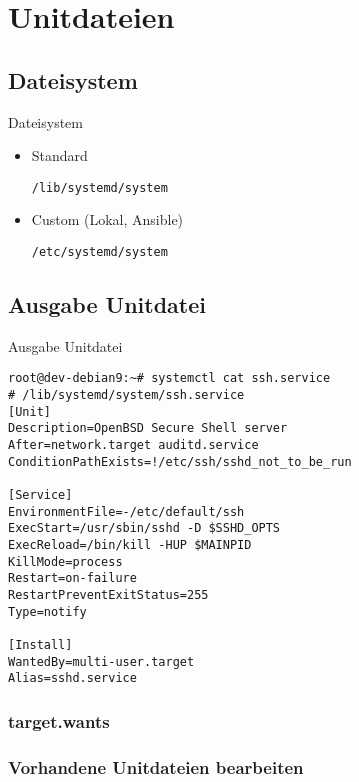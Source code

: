 \section{Unitdateien}

\subsection{Dateisystem}

\begin{frame}[fragile]{Dateisystem}
  \begin{itemize}
\item Standard

	\verb|/lib/systemd/system|
\item Custom (Lokal, Ansible)

	\verb|/etc/systemd/system|
\end{itemize}
\end{frame}

\subsection{Ausgabe Unitdatei}
\begin{frame}[fragile]{Ausgabe Unitdatei}
\begin{lstlisting}
root@dev-debian9:~# systemctl cat ssh.service
# /lib/systemd/system/ssh.service
[Unit]
Description=OpenBSD Secure Shell server
After=network.target auditd.service
ConditionPathExists=!/etc/ssh/sshd_not_to_be_run

[Service]
EnvironmentFile=-/etc/default/ssh
ExecStart=/usr/sbin/sshd -D $SSHD_OPTS
ExecReload=/bin/kill -HUP $MAINPID
KillMode=process
Restart=on-failure
RestartPreventExitStatus=255
Type=notify

[Install]
WantedBy=multi-user.target
Alias=sshd.service
\end{lstlisting}	
\end{frame}

\subsubsection{target.wants}

\subsubsection{Vorhandene Unitdateien bearbeiten}


